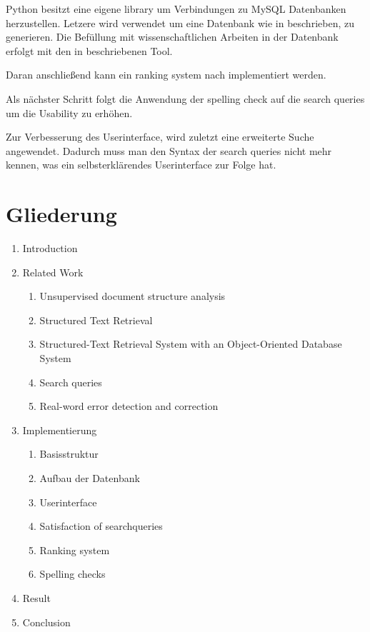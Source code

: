 \documentclass[a4paper, 12pt]{scrartcl}
\begin{document}
Python besitzt eine eigene library um Verbindungen zu MySQL Datenbanken herzustellen. Letzere wird verwendet um eine Datenbank wie in \cite{YA94} beschrieben, zu generieren. Die Befüllung mit 
wissenschaftlichen Arbeiten in der Datenbank erfolgt mit den in \cite{KGJK14} beschriebenen Tool.

Daran anschließend kann ein ranking system nach \cite{MRS08, RNBY99} implementiert werden. 

Als nächster Schritt folgt die Anwendung der spelling check auf die search queries um die Usability zu erhöhen.

Zur Verbesserung des Userinterface, wird zuletzt eine erweiterte Suche angewendet. Dadurch muss man den Syntax der search queries nicht mehr kennen, was ein selbsterklärendes Userinterface zur Folge hat. 

\section{Gliederung}

\begin{enumerate}
 \item Introduction
 \item Related Work
 \begin{enumerate}
  \item Unsupervised document structure analysis
  \item Structured Text Retrieval
  \item Structured-Text Retrieval System with an Object-Oriented Database System
  \item Search queries
  \item Real-word error detection and correction
 \end{enumerate}
 \item Implementierung
 \begin{enumerate}
  \item Basisstruktur
  \item Aufbau der Datenbank
  \item Userinterface
  \item Satisfaction of searchqueries
  \item Ranking system
  \item Spelling checks
 \end{enumerate}
 \item Result
 \item Conclusion
\end{enumerate}
\end{document}
